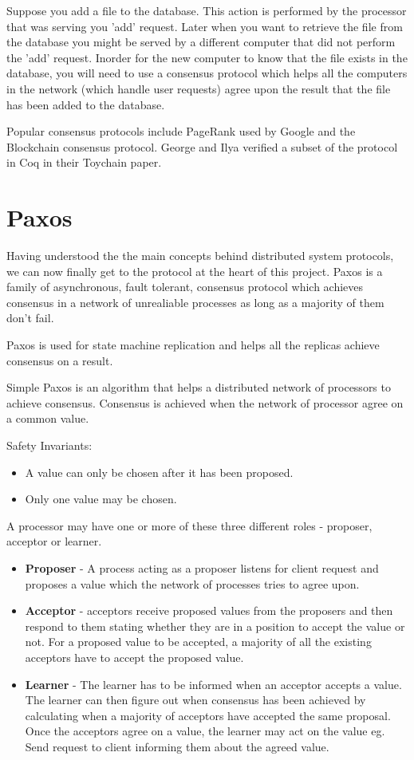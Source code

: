 Suppose you add a file to the database. This action is performed by the processor that
was serving you 'add' request. Later when you want to retrieve the file from the database
you might be served by a different computer that did not perform the 'add' request. Inorder
for the new computer to know that the file exists in the database, you will need to use a
consensus protocol which helps all the computers in the network (which handle user
requests) agree upon the result that the file has been added to the database.

Popular consensus protocols include PageRank used by Google and the Blockchain
consensus protocol. George and Ilya verified a subset of the protocol in Coq in
their Toychain paper.


\section{Paxos}
Having understood the the main concepts behind distributed system protocols, we can
now finally get to the protocol at the heart of this project. Paxos is a family of
asynchronous, fault tolerant, consensus protocol which achieves consensus in a network
of unrealiable processes as long as a majority of them don't fail.

Paxos is used for state machine replication and helps all the replicas achieve
consensus on a result.

Simple Paxos is an algorithm that helps a distributed network of processors to achieve consensus.
Consensus is achieved when the network of processor agree on a common value.

Safety Invariants:
\begin{itemize}
  \item A value can only be chosen after it has been proposed.
  \item Only one value may be chosen.
\end{itemize}

A processor may have one or more of these three different roles - proposer, acceptor or learner.
\begin{itemize}
  \item \textbf{Proposer} - A process acting as a proposer listens for client
    request and proposes a value which the network of processes tries to agree upon.
  \item \textbf{Acceptor} - acceptors receive proposed values from the proposers
    and then respond to them stating whether they are in a position to accept the value or not.
    For a proposed value to be accepted, a majority of all the existing acceptors have to accept the proposed value.
  \item \textbf{Learner} - The learner has to be informed when an acceptor accepts a value.
    The learner can then figure out when consensus has been achieved by calculating
    when a majority of acceptors have accepted the same proposal.
    Once the acceptors agree on a value, the learner may act on the value
    eg. Send request to client informing them about the agreed value.
\end{itemize}


